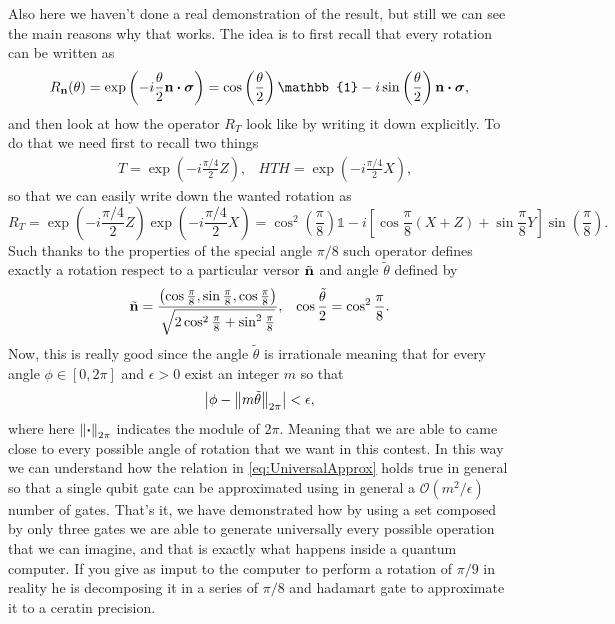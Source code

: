 {
    Also here we haven't done a real demonstration of the result, but still we can see the main reasons why that works. The idea is to first recall that every rotation can be written as
    \begin{equation}
        \label{eq:UniversalApprox}
        R_{\vb{n}}(\theta) = \exp\left( -i\frac{\theta}{2}\vb{n}\vdot \vb*{\sigma} \right) = \cos\left( \frac{\theta}{2} \right)\mathbb{1} - i\sin\left( \frac{\theta}{2} \right)\vb{n} \vdot \vb*{\sigma},
    \end{equation}
    and then look at how the operator $R_T$ look like by writing it down explicitly. To do that we need first to recall two things
    \begin{align}
        &T = \exp\left( -i\frac{\pi/4}{2}Z \right), &HTH = \exp\left( -i\frac{\pi/4}{2}X \right),
    \end{align}
    so that we can easily write down the wanted rotation as
    \begin{equation}
        R_T = \exp\left( -i\frac{\pi/4}{2}Z \right)\exp\left( -i\frac{\pi/4}{2}X \right) = \cos^2\left( \frac{\pi}{8} \right)\mathbb{1} - i\left[ \cos\frac{\pi}{8}\left( X + Z \right) + \sin\frac{\pi}{8} Y \right]\sin\left( \frac{\pi}{8} \right).
    \end{equation}
    Such thanks to the properties of the special angle $\pi/8$ such operator defines exactly a rotation respect to a particular versor $\tilde{\vb{n}}$ and angle $\tilde{\theta}$ defined by
    \begin{align}
        &\tilde{\vb{n}} = \frac{\left( \cos\frac{\pi}{8}, \sin \frac{\pi}{8}, \cos \frac{\pi}{8} \right)}{\sqrt{2\cos^2\frac{\pi}{8} + \sin^2\frac{\pi}{8}}}, &\cos \frac{\tilde{\theta}}{2} = \cos^2\frac{\pi}{8}.
    \end{align}
    Now, this is really good since the angle $\tilde{\theta}$ is irrationale meaning that for every angle $\phi \in [0, 2\pi]$ and $\epsilon > 0$ exist an integer $m$ so that
    \begin{equation}
        \abs{\phi - \left\lVert m\tilde{\theta} \right\rVert_{2\pi} } < \epsilon,
    \end{equation}
    where here $\left\lVert \vdot \right\rVert_{2\pi} $ indicates the module of $2\pi$. Meaning that we are able to came close to every possible angle of rotation that we want in this contest. In this way we can understand how the relation in \eqref{eq:UniversalApprox} holds true in general so that a single qubit gate can be approximated using in general a $\mathcal{O}(m^2/\epsilon)$ number of gates.
}
\noindent
That's it, we have demonstrated how by using a set composed by only three gates we are able to generate universally every possible operation that we can imagine, and that is exactly what happens inside a quantum computer. If you give as imput to the computer to perform a rotation of $\pi/9$ in reality he is decomposing it in a series of $\pi/8$ and hadamart gate to approximate it to a ceratin precision.

